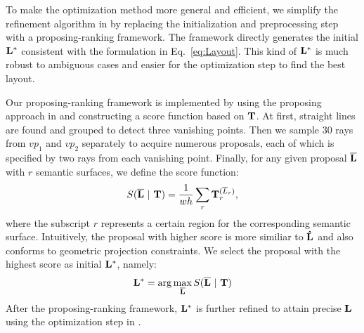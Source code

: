 To make the optimization method more general and efficient, we simplify the refinement algorithm in \cite{dasgupta2016delay} by replacing the initialization and preprocessing step with a proposing-ranking framework. The framework directly generates the initial $\mathbf{L^*}$ consistent with the formulation in Eq.~\ref{eq:Layout}. This kind of $\mathbf{L^*}$ is much robust to ambiguous cases and easier for the optimization step to find the best layout.

Our proposing-ranking framework is implemented by using the proposing approach in \cite{hedau2009recovering} and constructing a score function based on $\mathbf{T}$. At first, straight lines are found and grouped to detect three vanishing points. Then we sample 30 rays from $vp_1$ and $vp_2$ separately to acquire numerous proposals, each of which is specified by two rays from each vanishing point. Finally, for any given proposal $\mathbf{\overline{L}}$ with $r$ semantic surfaces, we define the score function:
%
\begin{equation}
\label{eq:scorefunction}
S(\mathbf{\overline{L}}~|~\mathbf{T}) = \frac{1}{wh}\sum_r \mathbf{T}_r^{(\overline{L}_r)},
\end{equation}
%
where the subscript $r$ represents a certain region for the corresponding semantic surface. Intuitively, the proposal with higher score is more similiar to $\mathbf{\hat{L}}$ and also conforms to geometric projection constraints. We select the proposal with the highest score as initial $\mathbf{L^*}$, namely:
%
\begin{equation}
\label{eq:initial}
\mathbf{L^*} = \arg\max_{\mathbf{\overline{L}}} S(\mathbf{\overline{L}}~|~\mathbf{T})
\end{equation}
%
After the proposing-ranking framework, $\mathbf{L^*}$ is further refined to attain precise $\mathbf{L}$ using the optimization step in \cite{dasgupta2016delay}.


